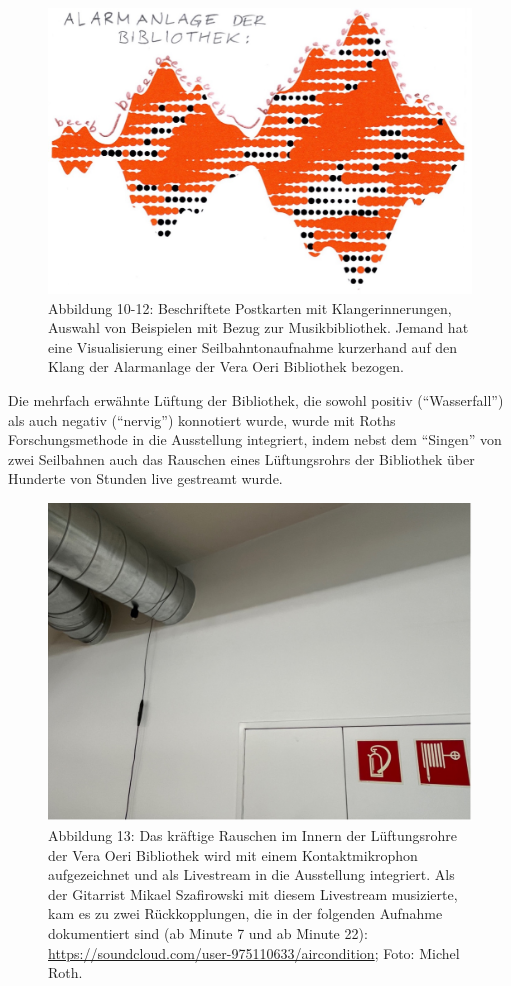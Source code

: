 \documentclass[a4paper,
fontsize=11pt,
oneside,
numbers=noperiodatend,
parskip=half-,
bibliography=totoc,
final
]{scrartcl}
\begin{document}
\begin{figure}[h]
\begin{minipage}[b]{0.32\textwidth}
        \includegraphics[width=\textwidth]{img/Abb12.jpg}
    \end{minipage}
            \caption{Abbildung 10-12: Beschriftete Postkarten mit Klangerinnerungen, Auswahl von Beispielen mit Bezug zur Musikbibliothek. Jemand hat eine Visualisierung einer Seilbahntonaufnahme kurzerhand auf den Klang der Alarmanlage der Vera Oeri Bibliothek bezogen.}
\end{figure}


Die mehrfach erwähnte Lüftung der Bibliothek, die sowohl positiv
(\enquote{Wasserfall}) als auch negativ (\enquote{nervig}) konnotiert
wurde, wurde mit Roths Forschungsmethode in die Ausstellung integriert,
indem nebst dem \enquote{Singen} von zwei Seilbahnen auch das Rauschen
eines Lüftungsrohrs der Bibliothek über Hunderte von Stunden live
gestreamt wurde.

\begin{figure}
\centering
\includegraphics{img/Abb13.jpg}
\caption{Abbildung 13: Das kräftige Rauschen im Innern der Lüftungsrohre
der Vera Oeri Bibliothek wird mit einem Kontaktmikrophon aufgezeichnet
und als Livestream in die Ausstellung integriert. Als der Gitarrist
Mikael Szafirowski mit diesem Livestream musizierte, kam es zu zwei
Rückkopplungen, die in der folgenden Aufnahme dokumentiert sind (ab
Minute 7 und ab Minute 22):
\url{https://soundcloud.com/user-975110633/aircondition}; Foto: Michel
Roth.}
\end{figure}
\end{document}
